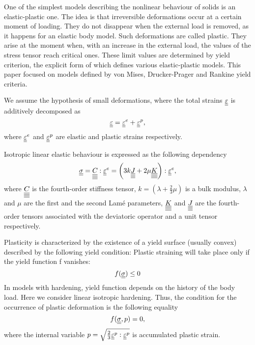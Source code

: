 \documentclass[12pt]{article}
\begin{document}
One of the simplest models describing the nonlinear behaviour of solids is an elastic-plastic one. The idea is that irreversible deformations occur at a certain moment of loading. They do not disappear when the external load is removed, as it happens for an elastic body model. Such deformations are called plastic. They arise at the moment when, with an increase in the external load, the values of the stress tensor reach critical ones. These limit values are determined by yield criterion, the explicit form of which defines various elastic-plastic models. This paper focused on models defined by von Mises, Drucker-Prager and Rankine yield criteria. 

We assume the hypothesis of small deformations, where the total strains $\underline{\underline{\varepsilon}}$ is additively decomposed as
\begin{equation}\label{eqn:eps_dec}
    \underline{\underline{\varepsilon}} = \underline{\underline{\varepsilon}}^e + \underline{\underline{\varepsilon}}^p,
\end{equation}
where $\underline{\underline{\varepsilon}}^e$ and $\underline{\underline{\varepsilon}}^p$ are elastic and plastic strains respectively.

Isotropic linear elastic behaviour is expressed as the following dependency
\begin{equation}
    \underline{\underline{\sigma}} = \underline{\underline{\underline{\underline{C_{}}}}} : \underline{\underline{\varepsilon}}^e = \left( 3k\underline{\underline{\underline{\underline{J}}}} + 2\mu\underline{\underline{\underline{\underline{K}}}} \right) : \underline{\underline{\varepsilon}}^e,
\end{equation}
where $\underline{\underline{\underline{\underline{C_{}}}}}$ is the fourth-order stiffness tensor, $k = (\lambda + \frac{2}{3}\mu)$ is a bulk modulus, $\lambda$ and $\mu$ are the first and the second Lamé parameters, $\underline{\underline{\underline{\underline{K}}}}$ and $\underline{\underline{\underline{\underline{J}}}}$ are the fourth-order tensors associated with the deviatoric operator and a unit tensor respectively.

Plasticity is characterized by the existence of a yield surface (usually convex) described by the following yield condition:
Plastic straining will take place only if the yield function f vanishes:
\begin{equation}
    f(\underline{\underline{\sigma}}) \leq 0
\end{equation}
In models with hardening, yield function depends on the history of the body load. Here we consider linear isotropic hardening. Thus, the condition for the occurrence of plastic deformation is the following equality
\begin{equation}
    f(\underline{\underline{\sigma}}, p) = 0, 
\end{equation}
where the internal variable $p = \sqrt{\frac{2}{3}\underline{\underline{\varepsilon}}^p : \underline{\underline{\varepsilon}}^p}$ is accumulated plastic strain.
\end{document}
